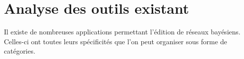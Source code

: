 \documentclass[conference]{IEEEtran}
\begin{document}




\section{Analyse des outils existant}
Il existe de nombreuses applications permettant l'édition de réseaux bayésiens. Celles-ci ont toutes leurs spécificités que l'on peut organiser sous forme de catégories. \\
\end{document}
